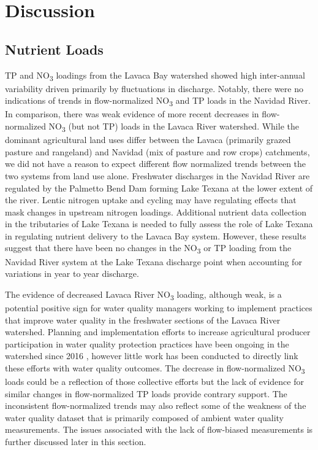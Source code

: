 \documentclass[fleqn,10pt,lineno]{wlpeerj} %
\begin{document}
\hypertarget{discussion}{%
\section*{Discussion}\label{discussion}}

\hypertarget{nutrient-loads}{%
\subsection*{Nutrient Loads}\label{nutrient-loads}}

TP and NO\textsubscript{3} loadings from the Lavaca Bay watershed showed
high inter-annual variability driven primarily by fluctuations in
discharge. Notably, there were no indications of trends in
flow-normalized NO\textsubscript{3} and TP loads in the Navidad River.
In comparison, there was weak evidence of more recent decreases in
flow-normalized NO\textsubscript{3} (but not TP) loads in the Lavaca
River watershed. While the dominant agricultural land uses differ
between the Lavaca (primarily grazed pasture and rangeland) and Navidad
(mix of pasture and row crops) catchments, we did not have a reason to
expect different flow normalized trends between the two systems from
land use alone. Freshwater discharges in the Navidad River are regulated
by the Palmetto Bend Dam forming Lake Texana at the lower extent of the
river. Lentic nitrogen uptake and cycling may have regulating effects
that mask changes in upstream nitrogen loadings. Additional nutrient
data collection in the tributaries of Lake Texana is needed to fully
assess the role of Lake Texana in regulating nutrient delivery to the
Lavaca Bay system. However, these results suggest that there have been
no changes in the NO\textsubscript{3} or TP loading from the Navidad
River system at the Lake Texana discharge point when accounting for
variations in year to year discharge.

The evidence of decreased Lavaca River NO\textsubscript{3} loading,
although weak, is a potential positive sign for water quality managers
working to implement practices that improve water quality in the
freshwater sections of the Lavaca River watershed. Planning and
implementation efforts to increase agricultural producer participation
in water quality protection practices have been ongoing in the watershed
since 2016
\autocite{schrammLavacaRiverWatershed2018,bertholdDirectMailingEducation2021},
however little work has been conducted to directly link these efforts
with water quality outcomes. The decrease in flow-normalized
NO\textsubscript{3} loads could be a reflection of those collective
efforts but the lack of evidence for similar changes in flow-normalized
TP loads provide contrary support. The inconsistent flow-normalized
trends may also reflect some of the weakness of the water quality
dataset that is primarily composed of ambient water quality
measurements. The issues associated with the lack of flow-biased
measurements is further discussed later in this section.
\end{document}
